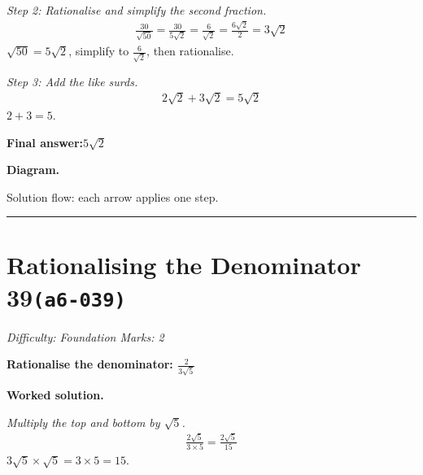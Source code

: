 \documentclass[11pt]{article}
\newcommand{\question}[1]{\par\medskip\noindent\textbf{#1}\par}
\begin{document}
\textit{Step 2: Rationalise and simplify the second fraction.}
\[\begin{gathered}
\frac{30}{\sqrt{50}} = \frac{30}{5\sqrt{2}} = \frac{6}{\sqrt{2}} = \frac{6\sqrt{2}}{2} = 3\sqrt{2}
\end{gathered}\]
\( \sqrt{50} = 5\sqrt{2} \), simplify to \( \frac{6}{\sqrt{2}} \), then rationalise.

\textit{Step 3: Add the like surds.}
\[\begin{gathered}
2\sqrt{2} + 3\sqrt{2} = 5\sqrt{2}
\end{gathered}\]
\( 2 + 3 = 5 \).

\begin{answerbox}
\textbf{Final answer:}\quad \(\displaystyle 5\sqrt{2}\)
\end{answerbox}
\textbf{Diagram.}

\begin{center}
\end{center}
\small Solution flow: each arrow applies one step.\normalsize

\medskip\hrule

\section*{Rationalising the Denominator 39\quad\small\texttt{(a6-039)}}
\textit{Difficulty: Foundation \quad\textbar\quad Marks: 2}

\question{Rationalise the denominator: \( \frac{2}{3\sqrt{5}} \)}

\textbf{Worked solution.}

\textit{Multiply the top and bottom by \( \sqrt{5} \).}
\[\begin{gathered}
\frac{2\sqrt{5}}{3 \times 5} = \frac{2\sqrt{5}}{15}
\end{gathered}\]
\( 3\sqrt{5} \times \sqrt{5} = 3 \times 5 = 15 \).
\end{document}
